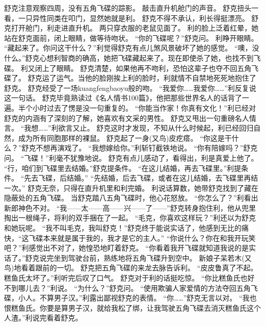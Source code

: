 \documentclass[a4paper,12pt,UTF8,twoside]{ctexbook}
\begin{document}
        舒克注意观察四周，没有五角飞碟的踪影。 
        敲击直升机舱门的声音。 
        舒克扭头一看，一只异性同类在叩门，显然她就是利。 
        舒克不得不承认，利长得挺漂亮。 
        舒克打开舱门，利走进直升机。 
        两只穿衣服的老鼠见面了。 
        利的脸上泛着红晕，她站在舒克面前，闭上眼睛，做等待吻状。 
        “你的飞碟呢？”舒克问。 
        利睁开眼睛。 
        “藏起来了。你问这干什么？”利觉得舒克有点儿煞风景破坏了她的感觉。 
        “噢，没什么。”舒克心想利智商的确高，她把飞碟藏起来了。现在即使杀了她，也找不到飞碟。 
        利又闭上了眼睛。 
        舒克清楚，如果他再不吻利，恐怕这辈子也夺不回五角飞碟了。 
        舒克运了运气。当他的脸刚挨上利的脸时，利就情不自禁地死死地抱住了舒克。 
        舒克经受了一场kuangfengbaoyu般的吻。 
        “我爱你……我爱你……”利反复说这一句话。 
        舒克毕竟熟读过《名人情书100篇》，他把那些世界名人的话背了一遍。半个小时过去了愣是没一句重复的。 
        “你能当作家！你真有文化！”利已经对舒克的内涵有了深刻的了解，她喜欢有文采的男性。 
        舒克又甩出一句重磅名人情言。 
        “我想……”利欲言又止。 
        舒克这时才发现，不知从什么时候起，利已经回归自然，成为所有同胞那样的裸鼠。 
        舒克起了一身(又鸟)皮疙瘩。 
        “你这是干什么？”舒克不想再演戏了。 
        “我想嫁给你。”利斩钉截铁地说。 
        “你有陪嫁吗？”舒克问。 
        “飞碟！”利毫不犹豫地说。 
        舒克有点儿感动了，看得出，利是真爱上他了。 
        “行，咱们到飞碟里去结婚。”舒克提条件。 
        “在这儿结婚，再去飞碟里。”利提条件。 
        “先去飞碟，后结婚。” 
        “先结婚，后去飞碟，或者在这儿结婚，去飞碟里再结一次。” 
        舒克无奈，只得在直升机里和利完婚。 
        利说话算数，她带舒克找到了藏在隐蔽处的五角飞碟。 
        当舒克踏八五角飞碟时，他心花怒放。 
        “你怎么了？”利看出新郎神色不对。 
        “我——太——高——兴——了——”舒克转身抱住利，他从兜里掏出一根绳子，将利的双手捆在了一起。 
        “毛克，你喜欢这样玩？”利还以为舒克和她玩呢。 
        “我不叫毛克，我叫舒克！”舒克终于能说实话了，他感到无比的痛快，“这飞碟本来就是属于我的，我才是它的主人。” 
        “你说什么？你在和我开玩笑吧？”利感觉出不对了，她惶恐地盯着舒克。 
        “你看着我开飞碟就知道我说的是实话了。”舒克说完坐到驾驶台前，熟练地将五角飞碟升到空中。 
        新娘子呆若木(又鸟)地看着跟前的一切。 
        舒克把五角飞碟的来龙去脉告诉利。 
        “皮皮鲁真了不起。糕鱼氏太坏了。”利听完后叹了口气。 
        舒克对于利的话挺吃惊。 
        “你比糕鱼氏也好不到哪儿去？”利说。 
        “为什么？”舒克问。 
        “使用欺骗人家爱情的方法夺回五角飞碟，小人。不算男子汉。”利露出鄙视舒克的表情。 
        “你……”舒克无言以对。 
        “我也恨糕鱼氏。你要是算男子汉，就给我松了绑，让我驾驶五角飞碟去消灭糕鱼氏这个人渣。”利说完看着舒克。 
\end{document}
